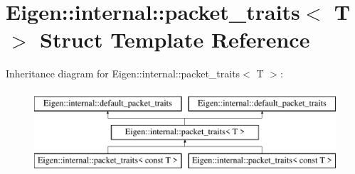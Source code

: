 \hypertarget{struct_eigen_1_1internal_1_1packet__traits}{}\section{Eigen\+:\+:internal\+:\+:packet\+\_\+traits$<$ T $>$ Struct Template Reference}
\label{struct_eigen_1_1internal_1_1packet__traits}
Inheritance diagram for Eigen\+:\+:internal\+:\+:packet\+\_\+traits$<$ T $>$\+:\begin{figure}[H]
\begin{center}
\leavevmode
\includegraphics[height=3.000000cm]{struct_eigen_1_1internal_1_1packet__traits}
\end{center}
\end{figure}
